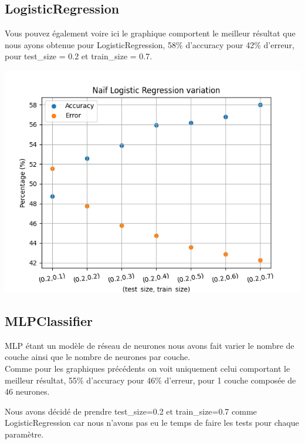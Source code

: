 \newpage

\subsection{LogisticRegression}
Vous pouvez également voire ici le graphique comportent le meilleur résultat que nous ayons obtenue pour LogisticRegression, 58\% d’accuracy pour 42\% d’erreur, pour test\_size = 0.2 et train\_size = 0.7.
\label{variation_LogisticRegression}

\begin{center}
    \includegraphics[scale=1]{graphs/variation-error_accuracy-1.png}
\end{center}

\newpage
\subsection{MLPClassifier}
MLP étant un modèle de réseau de neurones nous avons fait varier le nombre de couche ainsi que le nombre de neurones par couche.\\
Comme pour les graphiques précédents on voit uniquement celui comportant le meilleur résultat, 55\% d’accuracy pour 46\% d’erreur, pour 1 couche composée de 46 neurones.

Nous avons décidé de prendre test\_size=0.2 et train\_size=0.7 comme LogisticRegression car nous n'avons pas eu le temps de faire les tests pour chaque paramètre.

\label{variation_LogisticRegression}

